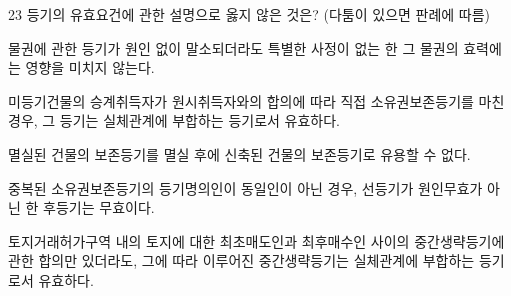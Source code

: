\begin{question}{23}
등기의 유효요건에 관한 설명으로 옳지 않은 것은? (다툼이 있으면 판례에 따름)
\begin{choices}
  \item 물권에 관한 등기가 원인 없이 말소되더라도 특별한 사정이 없는 한 그 물권의 효력에는 영향을 미치지 않는다.
  \item 미등기건물의 승계취득자가 원시취득자와의 합의에 따라 직접 소유권보존등기를 마친 경우, 그 등기는 실체관계에 부합하는 등기로서 유효하다.
  \item 멸실된 건물의 보존등기를 멸실 후에 신축된 건물의 보존등기로 유용할 수 없다.
  \item 중복된 소유권보존등기의 등기명의인이 동일인이 아닌 경우, 선등기가 원인무효가 아닌 한 후등기는 무효이다.
  \item 토지거래허가구역 내의 토지에 대한 최초매도인과 최후매수인 사이의 중간생략등기에 관한 합의만 있더라도, 그에 따라 이루어진 중간생략등기는 실체관계에 부합하는 등기로서 유효하다.
\end{choices}
\end{question}
